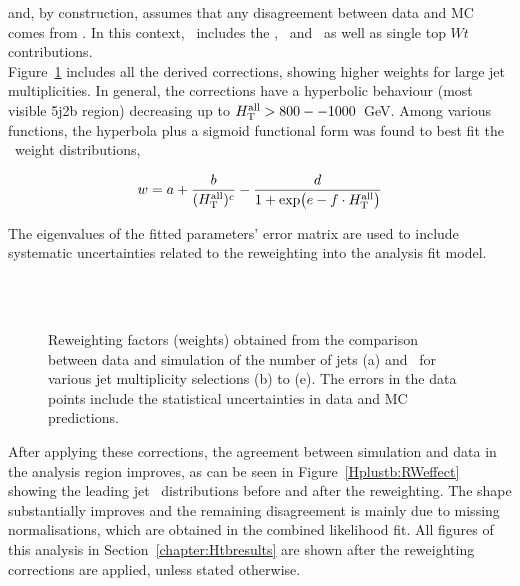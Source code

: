 and, by construction, assumes that any disagreement between data and MC comes from \ttbar. In this context, \ttbar\ includes the \ttb, \ttc\ and \ttl\ as well as single top $Wt$ contributions.\\

Figure~\ref{Hplustb:RWfactors} includes all the derived corrections, showing higher weights for large jet multiplicities. In general, the \HTall corrections have a hyperbolic behaviour (most visible 5j2b region) decreasing up to $H_{\text{T}}^{\text{all}} > 800--1000$~GeV. Among various functions, the hyperbola plus a sigmoid functional form was found to best fit the \HTall\ weight distributions,

\begin{equation}
w=a+\frac{b}{(H_{\text{T}}^{\text{all}})^c} - \frac{d}{1+\exp(e-f\cdot H_{\text{T}}^{\text{all}})}
\end{equation}

The eigenvalues of the fitted parameters' error matrix are used to include systematic uncertainties related to the reweighting into the analysis fit model.\\

\begin{figure}[htb]
    \RawFloats
    \begin{center}
     \\ 
      \\
    \caption{Reweighting factors (weights) obtained from the comparison between data and simulation of the number of jets (a) and \HTall\ for various jet multiplicity selections (b) to (e).
    The errors in the data points include the statistical uncertainties in data and MC predictions.}
    \label{Hplustb:RWfactors}
\end{center}
\end{figure}

After applying these corrections, the agreement between simulation and data in the analysis region improves, as can be seen in Figure~\ref{Hplustb:RWeffect} showing the leading jet \pT\ distributions before and after the reweighting. The shape substantially improves and the remaining disagreement is mainly due to missing normalisations, which are obtained in the combined likelihood fit. All figures of this analysis in Section~\ref{chapter:Htbresults} are shown after the reweighting corrections are applied, unless stated otherwise.


